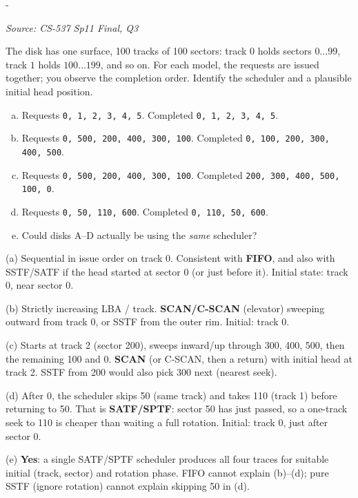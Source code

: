 \documentclass[11pt,a4paper]{article}
\makeatletter
\newcommand{\keepspace}[1]{\par\penalty-100\begingroup
  \setlength{\dimen@}{#1}\dimen@ii\pagegoal\advance\dimen@ii-\pagetotal
  \ifdim\dimen@>\dimen@ii\ifdim\dimen@ii>\z@\vfil\fi\break\fi\endgroup}
\newcounter{qn}[section]
\newenvironment{Qn}[4]{%
  \refstepcounter{qn}\keepspace{7\baselineskip}%
  \begin{tcolorbox}[qboxstyle, title={Q\thesection.\theqn\ \ [#1 \textbar\ #2]\ \ #4}]%
  {\footnotesize\color{g3}\textit{Source: #3}}\par\smallskip%
}{%
  \end{tcolorbox}%
}
\newenvironment{Sol}{%
  \begin{tcolorbox}[sboxstyle, title={Solution}]%
}{%
  \end{tcolorbox}\vspace{0.35em}%
}
\makeatother
\begin{document}
\begin{Qn}{Hard}{Lect 22}{CS-537 Sp11 Final, Q3}{Black-box disk scheduler identification}
The disk has one surface, 100 tracks of 100 sectors: track $0$ holds
sectors $0\ldots 99$, track $1$ holds $100\ldots 199$, and so on. For
each model, the requests are issued together; you observe the completion
order. Identify the scheduler and a plausible initial head position.
\begin{enumerate}[(a)]
\item Requests \texttt{0, 1, 2, 3, 4, 5}. Completed
      \texttt{0, 1, 2, 3, 4, 5}.
\item Requests \texttt{0, 500, 200, 400, 300, 100}. Completed
      \texttt{0, 100, 200, 300, 400, 500}.
\item Requests \texttt{0, 500, 200, 400, 300, 100}. Completed
      \texttt{200, 300, 400, 500, 100, 0}.
\item Requests \texttt{0, 50, 110, 600}. Completed
      \texttt{0, 110, 50, 600}.
\item Could disks A--D actually be using the \emph{same} scheduler?
\end{enumerate}
\end{Qn}
\begin{Sol}
(a) Sequential in issue order on track 0. Consistent with
\textbf{FIFO}, and also with SSTF/SATF if the head started at sector
$0$ (or just before it). Initial state: track 0, near sector 0.

(b) Strictly increasing LBA / track. \textbf{SCAN/C-SCAN} (elevator)
sweeping outward from track 0, or SSTF from the outer rim. Initial:
track 0.

(c) Starts at track 2 (sector 200), sweeps inward/up through 300, 400,
500, then the remaining 100 and 0. \textbf{SCAN} (or C-SCAN, then a
return) with initial head at track 2. SSTF from 200 would also pick
300 next (nearest seek).

(d) After 0, the scheduler skips 50 (same track) and takes 110 (track 1)
before returning to 50. That is \textbf{SATF/SPTF}: sector 50 has just
passed, so a one-track seek to 110 is cheaper than waiting a full
rotation. Initial: track 0, just after sector 0.

(e) \textbf{Yes}: a single SATF/SPTF scheduler produces all four traces
for suitable initial (track, sector) and rotation phase. FIFO cannot
explain (b)--(d); pure SSTF (ignore rotation) cannot explain skipping
50 in (d).
\end{Sol}
\end{document}
